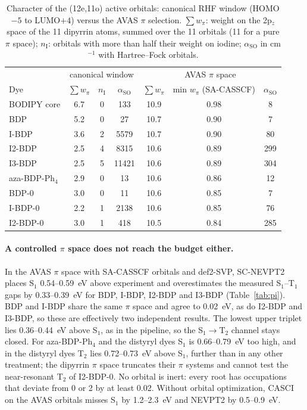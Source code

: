\documentclass[journal=jctcce,manuscript=article]{achemso}
\newcommand{\aso}{\alpha_\mathrm{SO}}
\begin{document}
\begin{table}
  \caption{Character of the (12e,11o) active orbitals: canonical RHF window (HOMO$-5$ to LUMO$+4$) versus
  the AVAS $\pi$ selection. $\sum w_\pi$: weight on the 2p$_z$ space of the 11 dipyrrin atoms, summed over
  the 11 orbitals (11 for a pure $\pi$ space); $n_\mathrm{I}$: orbitals with more than half their weight on
  iodine; $\aso$ in cm$^{-1}$ with Hartree--Fock orbitals.}
  \label{tab:window}
  \footnotesize\setlength{\tabcolsep}{4pt}
  \begin{tabular}{lcccccc}
    \toprule
    & \multicolumn{3}{c}{canonical window} & \multicolumn{3}{c}{AVAS $\pi$ space} \\
    Dye & $\sum w_\pi$ & $n_\mathrm{I}$ & $\aso$ & $\sum w_\pi$ & min $w_\pi$ (SA-CASSCF) & $\aso$ \\
    \midrule
    BODIPY core & 6.7 & 0 & 133   & 10.9 & 0.98 & 8 \\
    BDP         & 5.2 & 0 & 27    & 10.7 & 0.90 & 7 \\
    I-BDP       & 3.6 & 2 & 5579  & 10.7 & 0.90 & 80 \\
    I2-BDP      & 2.5 & 4 & 8315  & 10.6 & 0.89 & 299 \\
    I3-BDP      & 2.5 & 5 & 11421 & 10.6 & 0.89 & 304 \\
    aza-BDP-Ph$_4$ & 2.9 & 0 & 13  & 10.6 & 0.86 & 12 \\
    BDP-0       & 3.0 & 0 & 11    & 10.6 & 0.85 & 7 \\
    I-BDP-0     & 2.2 & 1 & 2138  & 10.6 & 0.85 & 76 \\
    I2-BDP-0    & 3.0 & 1 & 418   & 10.5 & 0.84 & 285 \\
    \bottomrule
  \end{tabular}
\end{table}

\paragraph{A controlled $\pi$ space does not reach the budget either.} In the AVAS $\pi$ space with
SA-CASSCF orbitals and def2-SVP, SC-NEVPT2 places S$_1$ 0.54--0.59~eV above experiment and overestimates the
measured S$_1$--T$_1$ gaps by 0.33--0.39~eV for BDP, I-BDP, I2-BDP and I3-BDP (Table~\ref{tab:pi}). BDP and I-BDP share
the same $\pi$ space and agree to 0.02~eV, as do I2-BDP and I3-BDP, so these are effectively two independent results. The lowest upper
triplet lies 0.36--0.44~eV above S$_1$, as in the pipeline, so the S$_1\to$T$_2$ channel stays closed. For
aza-BDP-Ph$_4$ and the distyryl dyes S$_1$ is 0.66--0.79~eV too high, and in the distyryl dyes T$_2$ lies
0.72--0.73~eV above S$_1$, further than in any other treatment; the dipyrrin $\pi$ space truncates their
$\pi$ systems and cannot test the near-resonant T$_2$ of I2-BDP-0. No
orbital is inert: every root has occupations that deviate from 0 or 2 by at least 0.02. Without orbital
optimization, CASCI on the AVAS orbitals misses S$_1$ by 1.2--2.3~eV and NEVPT2 by 0.5--0.9~eV.
\end{document}
